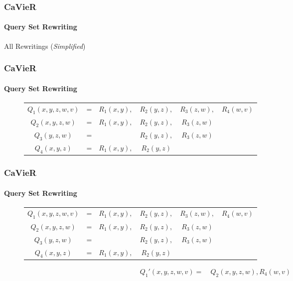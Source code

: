 \documentclass[
	11pt, %
]{beamer}
\begin{document}
\begin{frame}
	\frametitle{CaVieR}
	\framesubtitle{Query Set Rewriting}
	\begin{algorithm}[H]
		\caption{All Rewritings (\textit{Simplified})}\label{alg:AllRewriting}
		\begin{algorithmic}[1]
			\EndIf
			\Else
			\EndIf
			\EndFor
			\EndFunction
		\end{algorithmic}
	\end{algorithm}
\end{frame}

\begin{frame}
	\frametitle{CaVieR}
	\framesubtitle{Query Set Rewriting}
	\begin{figure}
		\begin{tabular}{cccccc}
			$Q_1(x,y,z,w,v)$ &=& $R_1(x,y),$&$R_2(y,z),$& $R_3(z,w), $&$R_4(w,v)$\\
			$Q_2(x,y,z,w)$ &=& $R_1(x,y),$&$R_2(y,z),$&$R_3(z,w)$&\\
			$Q_3(y,z,w)$ &=&& $R_2(y,z),$&$ R_3(z,w)$&\\
			$Q_4(x,y,z)$ &=& $R_1(x,y),$&$ R_2(y,z)$&&\\
		\end{tabular}
		\vspace{4cm}
	\end{figure}
\end{frame}

\begin{frame}
	\frametitle{CaVieR}
	\framesubtitle{Query Set Rewriting}
	\begin{figure}
		\begin{tabular}{cccccc}
			\color{red}$Q_1(x,y,z,w,v)$ &\color{red}=& \color{red}$R_1(x,y),$&\color{red}$R_2(y,z),$&\color{red} $R_3(z,w), $&\color{red}$R_4(w,v)$\\
			$Q_2(x,y,z,w)$ &=& $R_1(x,y),$&$R_2(y,z),$&$R_3(z,w)$&\\
			$Q_3(y,z,w)$ &=&& $R_2(y,z),$&$ R_3(z,w)$&\\
			$Q_4(x,y,z)$ &=& $R_1(x,y),$&$ R_2(y,z)$&&\\
		\end{tabular}
		\begin{align*}
			Q_1'(x,y,z,w,v) =&\ Q_2(x,y,z,w), R_4(w,v)&\\
		\end{align*}
		\vspace{2cm}
	\end{figure}
\end{frame}
\end{document}
